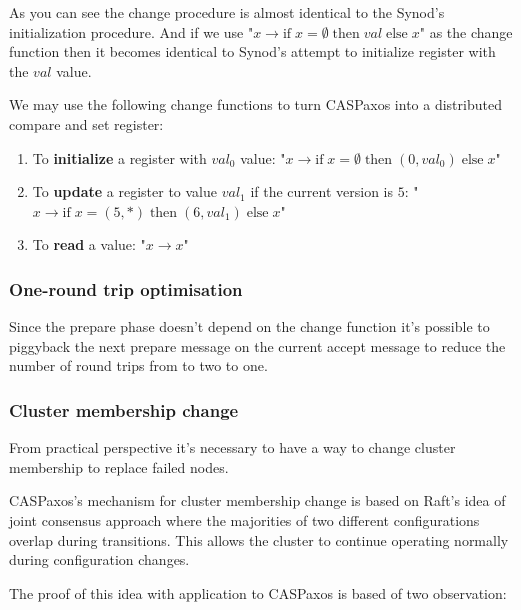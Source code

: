 \documentclass[12pt]{article}
\begin{document}
As you can see the change procedure is almost identical to the Synod's initialization procedure. And if we use "$x \to \mbox{if}\; x = \emptyset \;\mbox{then}\; val\; \mbox{else}\; x$" as the change function then it becomes identical to Synod's attempt to initialize register with the $val$ value.

We may use the following change functions to turn CASPaxos into a distributed compare and set register:
\begin{enumerate}
  \item To {\bf initialize} a register with $val_0$ value: "$x \to \mbox{if}\; x = \emptyset \;\mbox{then}\; (0, val_0)\; \mbox{else}\; x$"
  \item To {\bf update} a register to value $val_1$ if the current version is $5$: "$x \to \mbox{if}\; x = (5, \ast) \;\mbox{then}\; (6, val_1)\; \mbox{else}\; x$"
  \item To {\bf read} a value: "$x \to x$"
\end{enumerate}

\subsubsection{One-round trip optimisation}

Since the prepare phase doesn't depend on the change function it's possible to piggyback the next prepare message on the current accept message to reduce the number of round trips from to two to one.

\subsubsection{Cluster membership change}

From practical perspective it's necessary to have a way to change cluster membership to replace failed nodes. 

CASPaxos’s mechanism for cluster membership change is based on Raft's idea of joint consensus\cite{raft} approach where the majorities of two different configurations overlap during transitions. This allows the cluster to continue operating normally during configuration changes.

The proof of this idea with application to CASPaxos is based of two observation:
\end{document}
